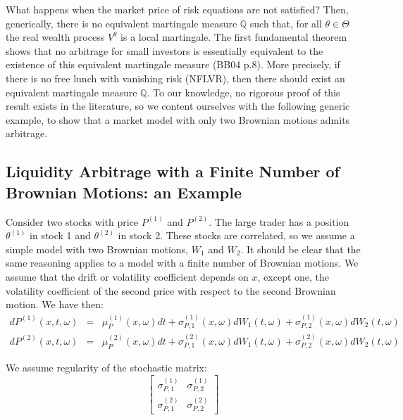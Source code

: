 \documentclass{article}
\begin{document}
\bigskip

What happens when the market price of risk equations are not satisfied?
Then, generically, there is no equivalent martingale measure $\mathbb{Q}$
such that, for all $\theta \in \Theta $ the real wealth process $V^{\theta }$
is a local martingale. The first fundamental theorem shows that no arbitrage
for small investors is essentially equivalent to the existence of this
equivalent martingale measure (BB04 p.8). More precisely, if there is no
free lunch with vanishing risk (NFLVR), then there should exist an
equivalent martingale measure $\mathbb{Q}$. To our knowledge, no rigorous
proof of this result exists in the literature, so we content ourselves with
the following generic example, to show that a market model with only two
Brownian motions admits arbitrage.

\bigskip

\subsection{Liquidity Arbitrage with a Finite Number of Brownian Motions: an
Example}

Consider two stocks with price $P^{(1)}$ and $P^{(2)}$. The large trader has
a position $\theta ^{(1)}$ in stock 1 and $\theta ^{(2)}$ in stock 2. These
stocks are correlated, so we assume a simple model with two Brownian
motions, $W_{1}$ and $W_{2}$. It should be clear that the same reasoning
applies to a model with a finite number of Brownian motions. We assume that
the drift or volatility coefficient depends on $x$, except one, the
volatility coefficient of the second price with respect to the second
Brownian motion. We have then:%
\begin{eqnarray*}
dP^{(1)}(x,t,\omega ) &=&\mu _{P}^{(1)}(x,\omega )dt+\sigma
_{P,1}^{(1)}(x,\omega )dW_{1}(t,\omega )+\sigma _{P,2}^{(1)}(x,\omega
)dW_{2}(t,\omega ) \\
dP^{(2)}(x,t,\omega ) &=&\mu _{P}^{(2)}(x,\omega )dt+\sigma
_{P,1}^{(2)}(x,\omega )dW_{1}(t,\omega )+\sigma _{P,2}^{(2)}(x,\omega
)dW_{2}(t,\omega )
\end{eqnarray*}

We assume regularity of the stochastic matrix:
\begin{equation*}
\left[
\begin{array}{cc}
\sigma _{P,1}^{(1)} & \sigma _{P,2}^{(1)} \\
\sigma _{P,1}^{(2)} & \sigma _{P,2}^{(2)}%
\end{array}%
\right]
\end{equation*}
\end{document}
